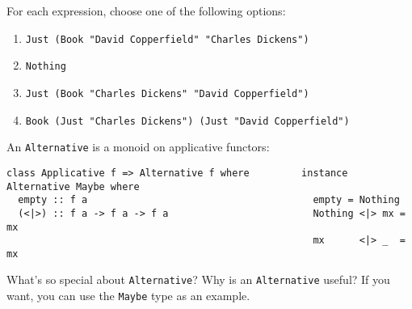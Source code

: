 \documentclass[a4paper,10pt,addpoints]{exam}
\begin{document}
\begin{questions}

  For each expression, choose one of the following options:

  \begin{enumerate}
  \item \texttt{Just (Book "David Copperfield" "Charles Dickens")}
  \item \texttt{Nothing}
  \item \texttt{Just (Book "Charles Dickens" "David Copperfield")}
  \item \texttt{Book (Just "Charles Dickens") (Just "David Copperfield")}
  \end{enumerate}

  \bonusquestion[1]

  An \texttt{Alternative} is a monoid on applicative functors:

  \begin{verbatim}
class Applicative f => Alternative f where         instance Alternative Maybe where
  empty :: f a                                       empty = Nothing
  (<|>) :: f a -> f a -> f a                         Nothing <|> mx = mx
                                                     mx      <|> _  = mx
  \end{verbatim}

  What's so special about \texttt{Alternative}? Why is an
  \texttt{Alternative} useful? If you want, you can use the
  \texttt{Maybe} type as an example.

\end{questions}

\newpage
\end{document}
